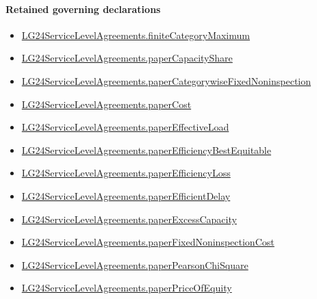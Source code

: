 \documentclass[10pt]{article}
\begin{document}
\paragraph{Retained governing declarations}
\begin{itemize}\raggedright
\item \hyperlink{governing-declaration-ab0dd462eff29fd7}{LG24\allowbreak{}Service\allowbreak{}Level\allowbreak{}Agreements.\allowbreak{}finite\allowbreak{}Category\allowbreak{}Maximum}
\item \hyperlink{governing-declaration-6d810744656fb451}{LG24\allowbreak{}Service\allowbreak{}Level\allowbreak{}Agreements.\allowbreak{}paper\allowbreak{}Capacity\allowbreak{}Share}
\item \hyperlink{governing-declaration-c5282f8695f217b4}{LG24\allowbreak{}Service\allowbreak{}Level\allowbreak{}Agreements.\allowbreak{}paper\allowbreak{}Categorywise\allowbreak{}Fixed\allowbreak{}Noninspection}
\item \hyperlink{governing-declaration-c94ee3dd07c6b492}{LG24\allowbreak{}Service\allowbreak{}Level\allowbreak{}Agreements.\allowbreak{}paper\allowbreak{}Cost}
\item \hyperlink{governing-declaration-f6f1c85dcb682371}{LG24\allowbreak{}Service\allowbreak{}Level\allowbreak{}Agreements.\allowbreak{}paper\allowbreak{}Effective\allowbreak{}Load}
\item \hyperlink{governing-declaration-e3687614c9582751}{LG24\allowbreak{}Service\allowbreak{}Level\allowbreak{}Agreements.\allowbreak{}paper\allowbreak{}Efficiency\allowbreak{}Best\allowbreak{}Equitable}
\item \hyperlink{governing-declaration-a93f808fc9b83a7a}{LG24\allowbreak{}Service\allowbreak{}Level\allowbreak{}Agreements.\allowbreak{}paper\allowbreak{}Efficiency\allowbreak{}Loss}
\item \hyperlink{governing-declaration-70a77d3cfca440a2}{LG24\allowbreak{}Service\allowbreak{}Level\allowbreak{}Agreements.\allowbreak{}paper\allowbreak{}Efficient\allowbreak{}Delay}
\item \hyperlink{governing-declaration-cfc6c9e8c89655cd}{LG24\allowbreak{}Service\allowbreak{}Level\allowbreak{}Agreements.\allowbreak{}paper\allowbreak{}Excess\allowbreak{}Capacity}
\item \hyperlink{governing-declaration-8689462da5b50f81}{LG24\allowbreak{}Service\allowbreak{}Level\allowbreak{}Agreements.\allowbreak{}paper\allowbreak{}Fixed\allowbreak{}Noninspection\allowbreak{}Cost}
\item \hyperlink{governing-declaration-dd6b2af24ec4f24e}{LG24\allowbreak{}Service\allowbreak{}Level\allowbreak{}Agreements.\allowbreak{}paper\allowbreak{}Pearson\allowbreak{}Chi\allowbreak{}Square}
\item \hyperlink{governing-declaration-54aa3d28e4e76576}{LG24\allowbreak{}Service\allowbreak{}Level\allowbreak{}Agreements.\allowbreak{}paper\allowbreak{}Price\allowbreak{}Of\allowbreak{}Equity}
\end{itemize}
\end{document}
